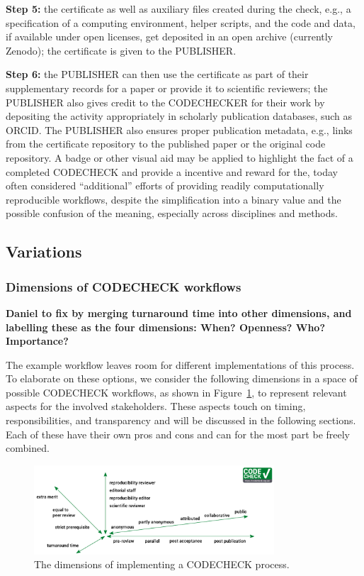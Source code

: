 \documentclass[12pt]{article}
\begin{document}
\textbf{Step 5:} the certificate as well as auxiliary files created
during the check, e.g., a specification of a computing environment,
helper scripts, and the code and data, if available under open
licenses, get deposited in an open archive (currently Zenodo); the
certificate is given to the PUBLISHER.

\textbf{Step 6:} the PUBLISHER can then use the certificate as part of their
supplementary records for a paper or provide it to scientific reviewers; the
PUBLISHER also gives credit to the CODECHECKER for their work by depositing the
activity appropriately in scholarly publication databases, such as ORCID.
The PUBLISHER also ensures proper publication metadata, e.g., links from the 
certificate repository to the published paper or the original code repository.
A badge or other visual aid may be applied to highlight the fact of a completed
CODECHECK and provide a incentive and reward for the, today often considered
``additional'' efforts of providing readily computationally reproducible workflows,
despite the simplification into a binary value and the possible confusion of
the meaning, especially across disciplines and methods.

\subsection*{Variations}\label{variations}

\subsubsection*{Dimensions of CODECHECK workflows}\label{dimensions-of-workflows}

\textbf{Daniel to fix by merging turnaround time into other
  dimensions, and labelling these as the four dimensions: When?
  Openness? Who? Importance?}

The example workflow leaves room for different
implementations of this process. To elaborate on these options, we consider
the following dimensions in a space of possible CODECHECK workflows, as shown in 
Figure~\ref{fig:dimensions}, to represent relevant aspects for the involved
stakeholders. These aspects touch on timing, responsibilities, and 
transparency and will be discussed in the following sections.
Each of these have their own pros and cons and can for the most part be
freely combined.

\begin{figure}
  \centering
      \includegraphics[width=0.8\textwidth]{figs/codecheck_dimensions.pdf}
  \caption{The dimensions of implementing a CODECHECK process.}
  \label{fig:dimensions}
\end{figure}
\end{document}
